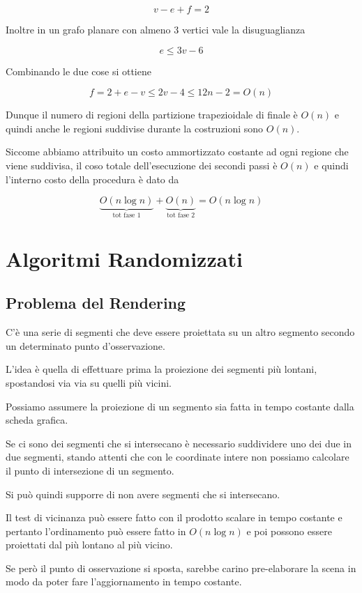 $$
v -e +f = 2
$$ 

Inoltre in un grafo planare con almeno 3 vertici vale la disuguaglianza

$$
e \leq 3v -6
$$

Combinando le due cose si ottiene

$$
f = 2 + e -v \leq 2v - 4 \leq 12n -2 = O(n)
$$

Dunque il numero di regioni della partizione trapezioidale di finale è $O(n)$ e quindi anche le regioni suddivise durante la costruzioni sono $O(n)$.

Siccome abbiamo attribuito un costo ammortizzato costante ad ogni regione che viene suddivisa, il coso totale dell'esecuzione dei secondi passi è $O(n)$ e quindi l'interno costo della procedura è dato da

$$
\underbrace{O(n \log n)}_{\text{tot fase 1}} + \underbrace{O(n)}_{\text{tot fase 2}} = O(n \log n)
$$



\chapter{Algoritmi Randomizzati}

\section{Problema del Rendering}\label{problema-del-rendering}

C'è una serie di segmenti che deve essere proiettata su un altro segmento secondo un determinato punto d'osservazione.

L'idea è quella di effettuare prima la proiezione dei segmenti più lontani, spostandosi via via su quelli più vicini.

Possiamo assumere la proiezione di un segmento sia fatta in tempo costante dalla scheda grafica.

Se ci sono dei segmenti che si intersecano è necessario suddividere uno dei due in due segmenti, stando attenti che con le coordinate intere non possiamo calcolare il punto di intersezione di un segmento.

Si può quindi supporre di non avere segmenti che si intersecano.

Il test di vicinanza può essere fatto con il prodotto scalare in tempo costante e pertanto l'ordinamento può essere fatto in $O(n \log n)$ e poi possono essere proiettati dal più lontano al più vicino.

Se però il punto di osservazione si sposta, sarebbe carino pre-elaborare la scena in modo da poter fare l'aggiornamento in tempo costante.
